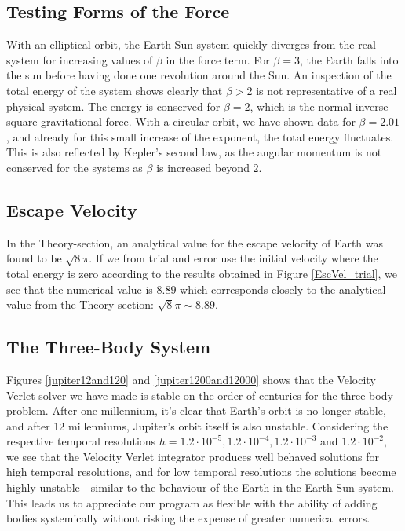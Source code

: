 \subsection{Testing Forms of the Force}
With an elliptical orbit, the Earth-Sun system quickly diverges from the real system for increasing values of $\beta$ in the force term. For $\beta = 3$, the Earth falls into the sun before having done one revolution around the Sun. An inspection of the total energy of the system shows clearly that $\beta > 2$ is not representative of a real physical system. The energy is conserved for $\beta = 2$, which is the normal inverse square gravitational force. With a circular orbit, we have shown data for $\beta = 2.01$, and already for this small increase of the exponent, the total energy fluctuates. This is also reflected by Kepler's second law, as the angular momentum is not conserved for the systems as $\beta$ is increased beyond $2$. 

\subsection{Escape Velocity}
In the Theory-section, an analytical value for the escape velocity of Earth was found to be $\sqrt{8}\pi$. If we from trial and error use the initial velocity where the total energy is zero according to the results obtained in Figure \ref{EscVel_trial}, we see that the numerical value is 8.89 which corresponds closely to the analytical value from the Theory-section:  $\sqrt{8}\pi \sim 8.89$.

\subsection{The Three-Body System}
Figures \ref{jupiter12and120} and \ref{jupiter1200and12000} shows that the Velocity Verlet solver we have made is stable on the order of centuries for the three-body problem. After one millennium, it's clear that Earth's orbit is no longer stable, and after 12 millenniums, Jupiter's orbit itself is also unstable. Considering the respective temporal resolutions $h = 1.2\cdot10^{-5}, 1.2\cdot10^{-4}, 1.2\cdot10^{-3}$ and $1.2\cdot10^{-2}$, we see that the Velocity Verlet integrator produces well behaved solutions for high temporal resolutions, and for low temporal resolutions the solutions become highly unstable - similar to the behaviour of the Earth in the Earth-Sun system. This leads us to appreciate our program as flexible with the ability of adding bodies systemically without risking the expense of greater numerical errors. 

